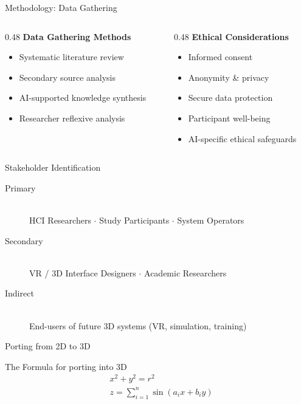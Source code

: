 \documentclass[aspectratio=169, 10pt]{beamer}
\begin{document}
\begin{frame}{Methodology: Data Gathering}
  \begin{columns}[T]
    \begin{column}{0.48\textwidth}
      \textbf{Data Gathering Methods}
      \begin{itemize}
        \item Systematic literature review
        \item Secondary source analysis
        \item AI-supported knowledge synthesis
        \item Researcher reflexive analysis
      \end{itemize}
    \end{column}
    \begin{column}{0.48\textwidth}
      \textbf{Ethical Considerations}
      \begin{itemize}
        \item Informed consent
        \item Anonymity \& privacy
        \item Secure data protection
        \item Participant well-being
        \item AI-specific ethical safeguards
      \end{itemize}
    \end{column}
  \end{columns}
\end{frame}

\begin{frame}{Stakeholder Identification}
  \begin{description}
    \item[\color{PrimaryBlue}Primary]~\\
      HCI Researchers \(\cdot\) Study Participants \(\cdot\) System Operators
    \item[\color{AccentTeal}Secondary]~\\
      VR / 3D Interface Designers \(\cdot\) Academic Researchers
    \item[Indirect]~\\
      End-users of future 3D systems (VR, simulation, training)
  \end{description}
\end{frame}

\begin{frame}{Porting from 2D to 3D}
  \begin{block}{The Formula for porting into 3D}
    \begin{align*}
        &x^2 + y^2 = r^2 \\
        &z = \sum_{i=1}^n \sin(a_ix+b_iy)
    \end{align*}
  \end{block}
\end{frame}
\end{document}
